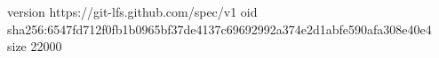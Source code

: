 version https://git-lfs.github.com/spec/v1
oid sha256:6547fd712f0fb1b0965bf37de4137c69692992a374e2d1abfe590afa308e40e4
size 22000
